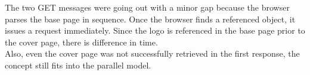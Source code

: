 \documentclass[titlepage, paper=a4, fontsize=11pt]{scrartcl} %
\numberwithin{equation}{section} %
\numberwithin{figure}{section} %
\numberwithin{table}{section} %
\begin{document}
The two GET messages were going out with a minor gap because the browser parses the base page in sequence.
Once the browser finds a referenced object, it issues a request immediately. Since the logo is referenced in the base page prior to the cover page, there is difference in time. \\

Also, even the cover page was not successfully retrieved in the first response, the concept still fits into the parallel model.
\end{document}
